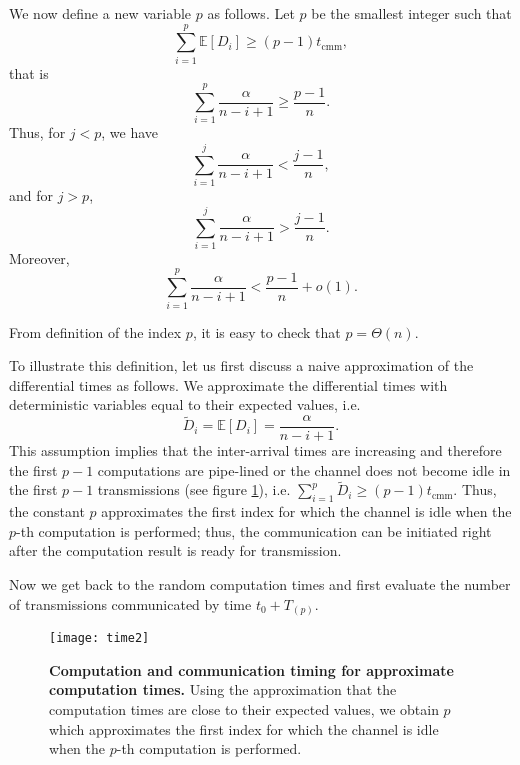 \documentclass[onecolumn,journal,twoside]{IEEEtran}
\newcommand{\Expc}{\mathbb{E}}
\begin{document}
We now define a new variable $p$ as follows. Let $p$ be the smallest integer such that
\begin{equation}
    \sum_{i=1}^{p} \mathbb{E}[D_i] \geq (p-1)t_{\text{cmm}}, 
\end{equation}
that is
\begin{equation}\label{eq:pdef}
    \sum_{i=1}^{p} \frac{\alpha}{n-i+1} \geq \frac{p-1}{n}. 
\end{equation}
Thus, for $j<p$, we have 
\begin{equation}
    \sum_{i=1}^{j} \frac{\alpha}{n-i+1} < \frac{j-1}{n},
\end{equation}
and for $j>p$, 
\begin{equation}
    \sum_{i=1}^{j} \frac{\alpha}{n-i+1} > \frac{j-1}{n}. 
\end{equation}
Moreover, 
\begin{equation}\label{eq:48}
    \sum_{i=1}^{p} \frac{\alpha}{n-i+1} < \frac{p-1}{n}+o(1). 
\end{equation}


From definition of the index $p$, it is easy to check that $p=\Theta(n)$.

To illustrate this definition, let us first discuss a naive approximation of the differential times as follows. We approximate the differential times with deterministic variables equal to their expected values, i.e.
\begin{equation}
    \widetilde{D}_i = \Expc[D_i]=\frac{\alpha}{n-i+1}.
\end{equation}
This assumption implies that the inter-arrival times are increasing and therefore the first $p-1$ computations are pipe-lined or the channel does not become idle in the first $p-1$ transmissions (see figure \ref{fig:timing2}), i.e. $\sum_{i=1}^{p} \widetilde{D}_i \geq (p-1)t_{\text{cmm}}$. Thus, the constant $p$ approximates the first index for which the channel is idle when the $p$-th computation is performed; thus, the communication can be initiated right after the computation result is ready for transmission. 

Now we get back to the random computation times and first evaluate the number of transmissions communicated by time $t_0+T_{(p)}$.

\begin{figure}[h]
\begin{center}
\texttt{[image: time2]}
    \caption{\small{\textbf{Computation and communication timing for approximate computation times.} Using the approximation that the computation times are close to their expected values, we obtain $p$ which approximates the first index for which the channel is idle when the $p$-th computation is performed. }}
    \label{fig:timing2}
    \end{center}
\end{figure}
\end{document}
